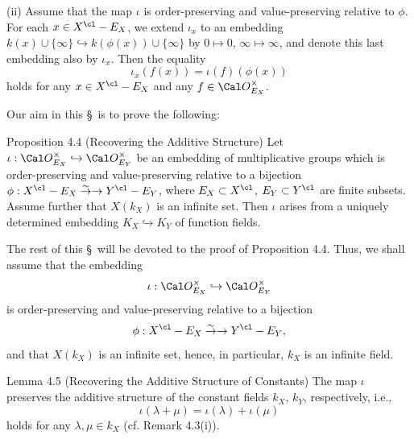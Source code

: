 \noindent
(ii) Assume that the map 
$\iota
$ 
is order-preserving and value-preserving relative to $\phi$. 
For each $x\in X^{\cl}-E_X$, we extend 
$\iota_x
$ 
to an embedding 
$k(x)\cup\{\infty\} \hookrightarrow k(\phi(x))\cup\{\infty\}$ 
by $0\mapsto 0$, $\infty\mapsto\infty$, and denote this last 
embedding also by $\iota_x$. Then the equality 
$$\iota _x(f(x))=\iota (f)(\phi (x))$$
holds for any $x\in X^{\cl}-E_X$ and any $f\in {\Cal O}_{E_X}^{\times}$. 
\enddefinition

Our aim in this \S\  is to prove the following:

\proclaim
{Proposition 4.4 (Recovering the Additive Structure)} Let 
$\iota : \Cal O_{E_X}^{\times}\hookrightarrow \Cal O_{E_Y}^{\times}$
be an embedding of multiplicative groups which is order-preserving and
value-preserving relative to a bijection $\phi :X^{\cl}-
E_X\isom Y^{\cl}- E_Y$, where $E_X\subset X^{\cl}$, $E_Y\subset 
 Y^{\cl}$ are finite subsets. Assume further that 
$X(k_X)$ is an infinite set. Then $\iota$ arises from a uniquely 
determined embedding $K_X \hookrightarrow K_Y$ of function fields.
\endproclaim

The rest of this \S\  will be devoted to the proof of Proposition 4.4. 
Thus, we shall assume that the embedding
$$\iota : \Cal O_{E_X}^{\times}\hookrightarrow \Cal O_{E_Y}^{\times}$$
is order-preserving and value-preserving relative to
a bijection
$$\phi:X^{\cl}-E_X\isom Y^{\cl}-E_Y,$$ 
and that $X(k_X)$ is an infinite set, hence, in particular, 
$k_X$ is an infinite field. 

\proclaim
{Lemma 4.5 (Recovering the Additive Structure of Constants)}
The map $\iota$ preserves the additive structure of the constant 
fields $k_X$, $k_Y$, respectively, i.e., 
$$\iota (\lambda+\mu) = \iota (\lambda)+\iota (\mu)$$ 
holds for any $\lambda, \mu\in k_X$ (cf. Remark 4.3(i)).
\endproclaim

